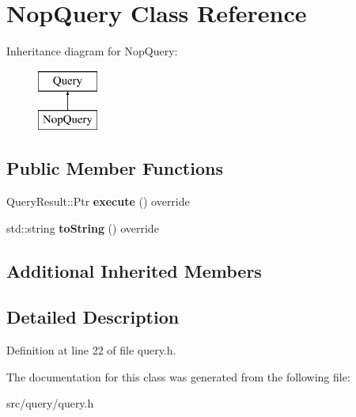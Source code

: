 \hypertarget{class_nop_query}{}\section{Nop\+Query Class Reference}
\label{class_nop_query}
Inheritance diagram for Nop\+Query\+:\begin{figure}[H]
\begin{center}
\leavevmode
\includegraphics[height=2.000000cm]{class_nop_query}
\end{center}
\end{figure}
\subsection*{Public Member Functions}
\begin{DoxyCompactItemize}
\item 
\mbox{\label{class_nop_query_a698ec803e0e04fb153b6b4137ec1da27}} 
Query\+Result\+::\+Ptr {\bfseries execute} () override
\item 
\mbox{\label{class_nop_query_abe83dbc25bcc2d4d20fd5699a636e8dc}} 
std\+::string {\bfseries to\+String} () override
\end{DoxyCompactItemize}
\subsection*{Additional Inherited Members}


\subsection{Detailed Description}


Definition at line 22 of file query.\+h.



The documentation for this class was generated from the following file\+:\begin{DoxyCompactItemize}
\item 
src/query/query.\+h\end{DoxyCompactItemize}
